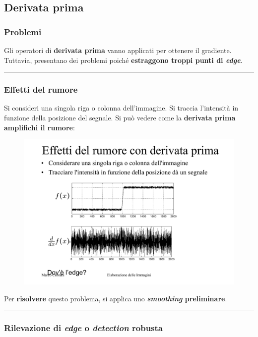 \documentclass[a4paper]{article}
\newcommand{\longline}{\noindent\rule{\textwidth}{0.4pt}}
\begin{document}
	\subsection{Derivata prima}
	
	\subsubsection{Problemi}
	
	Gli operatori di \textbf{derivata prima} vanno applicati per ottenere il gradiente. Tuttavia, presentano dei problemi poiché \textbf{estraggono troppi punti di \emph{edge}}.
	
	\longline
	
	\subsubsection{Effetti del rumore}
	
	Si consideri una singola riga o colonna dell'immagine. Si traccia l'intensità in funzione della posizione del segnale. Si può vedere come la \textbf{derivata prima amplifichi il rumore}:
	\begin{figure}[!htp]
		\centering
		\includegraphics[width=.8\textwidth]{img/derivata_prima.pdf}
	\end{figure}

	\noindent
	Per \textbf{risolvere} questo problema, si applica uno \textbf{\emph{smoothing} preliminare}.

	\longline
	
	\subsubsection{Rilevazione di \emph{edge} o \emph{detection} robusta}
	
\end{document}
